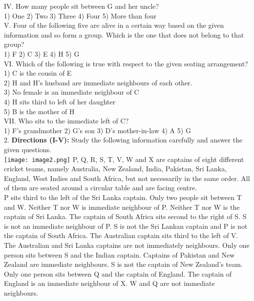 \documentclass[
]{article}
\begin{document}
IV. How many people sit between G and her uncle?\\
1) One \hspace{2mm}2) Two \hspace{2mm}3) Three \hspace{2mm}4) Four \hspace{2mm}5) More than four\\

V. Four of the following five are alive in a certain way based on the given information and
so form a group. Which is the one that does not belong to that group?\\
1) F \hspace{2mm}2) C \hspace{2mm}3) E \hspace{2mm}4) H \hspace{2mm}5) G\\

VI. Which of the following is true with respect to the given seating arrangement?\\
1) C is the cousin of E\\
2) H and H’s husband are immediate neighbours of each other.\\
3) No female is an immediate neighbour of C\\
4) H sits third to left of her daughter\\
5) B is the mother of H\\

VII. Who sits to the immediate left of C?\\
1) F’s grandmother \hspace{2mm}2) G’s son \hspace{2mm}3) D’s mother-in-law
\hspace{2mm}4) A \hspace{2mm}5) G\\

2. \textbf{Directions (I-V):} Study the following information carefully and answer the given
questions.\\
\texttt{[image: image2.png]}
P, Q, R, S, T, V, W and X are captains of eight different cricket teams, namely Australia, New
Zealand, India, Pakistan, Sri Lanka, England, West Indies and South Africa, but not
necessarily in the same order. All of them are seated around a circular table and are facing
centre.\\
P sits third to the left of the Sri Lanka captain. Only two people sit between T and W.
Neither T nor W is immediate neighbour of P. Neither T nor W is the captain of Sri Lanka.
The captain of South Africa sits second to the right of S. S is not an immediate neighbour of
P. S is not the Sri Lankan captain and P is not the captain of South Africa. The Australian
captain sits third to the left of V. The Australian and Sri Lanka captains are not immediately
neighbours. Only one person sits between S and the Indian captain. Captains of Pakistan
and New Zealand are immediate neighbours. S is not the captain of New Zealand’s team.\\
Only one person sits between Q and the captain of England. The captain of England is an
immediate neighbour of X. W and Q are not immediate neighbours.\\
\end{document}
